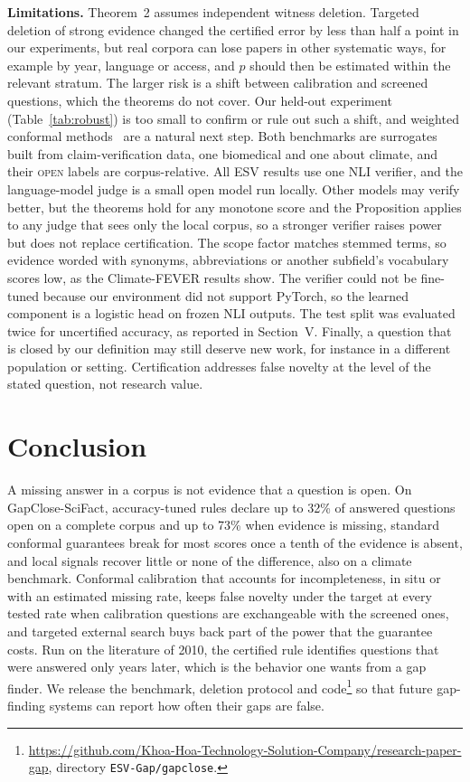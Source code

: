 \documentclass[conference,a4paper]{IEEEtran}
\theoremstyle{definition}
\newcommand{\open}{\textup{\textsc{open}}}
\begin{document}
\textbf{Limitations.} Theorem~2 assumes independent witness deletion. Targeted deletion of strong evidence changed the certified error by less than half a point in our experiments, but real corpora can lose papers in other systematic ways, for example by year, language or access, and $\hat p$ should then be estimated within the relevant stratum. The larger risk is a shift between calibration and screened questions, which the theorems do not cover. Our held-out experiment (Table~\ref{tab:robust}) is too small to confirm or rule out such a shift, and weighted conformal methods~\cite{tibshirani2019} are a natural next step. Both benchmarks are surrogates built from claim-verification data, one biomedical and one about climate, and their \open{} labels are corpus-relative. All ESV results use one NLI verifier, and the language-model judge is a small open model run locally. Other models may verify better, but the theorems hold for any monotone score and the Proposition applies to any judge that sees only the local corpus, so a stronger verifier raises power but does not replace certification. The scope factor matches stemmed terms, so evidence worded with synonyms, abbreviations or another subfield's vocabulary scores low, as the Climate-FEVER results show. The verifier could not be fine-tuned because our environment did not support PyTorch, so the learned component is a logistic head on frozen NLI outputs. The test split was evaluated twice for uncertified accuracy, as reported in Section~V. Finally, a question that is closed by our definition may still deserve new work, for instance in a different population or setting. Certification addresses false novelty at the level of the stated question, not research value.

\section{Conclusion}
A missing answer in a corpus is not evidence that a question is open. On GapClose-SciFact, accuracy-tuned rules declare up to 32\% of answered questions open on a complete corpus and up to 73\% when evidence is missing, standard conformal guarantees break for most scores once a tenth of the evidence is absent, and local signals recover little or none of the difference, also on a climate benchmark. Conformal calibration that accounts for incompleteness, in situ or with an estimated missing rate, keeps false novelty under the target at every tested rate when calibration questions are exchangeable with the screened ones, and targeted external search buys back part of the power that the guarantee costs. Run on the literature of 2010, the certified rule identifies questions that were answered only years later, which is the behavior one wants from a gap finder. We release the benchmark, deletion protocol and code\footnote{\url{https://github.com/Khoa-Hoa-Technology-Solution-Company/research-paper-gap}, directory \texttt{ESV-Gap/gapclose}.} so that future gap-finding systems can report how often their gaps are false.
\end{document}
